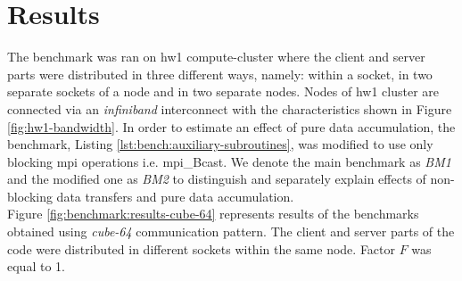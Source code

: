 \section{Results}
\label{sec:accumulator-results}


The benchmark was ran on \gls{hw1} compute-cluster where the client and server parts were distributed in three different ways, namely: within a socket, in two separate sockets of a node and in two separate nodes. Nodes of \gls{hw1} cluster are connected via an  \textit{infiniband} interconnect with the characteristics shown in Figure \ref{fig:hw1-bandwidth}. In order to estimate an effect of pure data accumulation, the benchmark, Listing \ref{lst:bench:auxiliary-subroutines}, was modified to use only blocking \acrshort{mpi} operations i.e. \acrshort{mpi}\_Bcast. We denote the main benchmark as \textit{BM1} and the modified one as \textit{BM2} to distinguish and separately explain effects of non-blocking data transfers and pure data accumulation.\\


Figure \ref{fig:benchmark:results-cube-64} represents results of the benchmarks obtained using \textit{cube-64} communication pattern. The client and server parts of the code were distributed in different sockets within the same node. Factor $F$ was  equal to 1.\\


